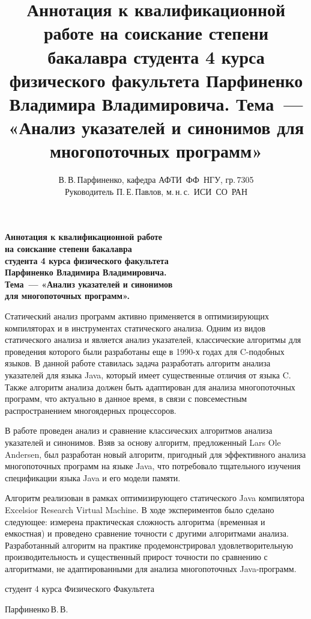 \documentclass[12pt]{article}
\title{
  Аннотация к квалификационной работе на соискание степени бакалавра студента 4
  курса физического факультета Парфиненко Владимира Владимировича.
  Тема~--- «Анализ указателей и синонимов для многопоточных программ»
}
\author{
  В.\,В.\,Парфиненко, кафедра АФТИ~ФФ~НГУ, гр.\,7305\\
  Руководитель П.\,Е.\,Павлов, м.\,н.\,с.~ИСИ~СО~РАН
}
\newcommand{\eng}[1]{{\English#1}}
\begin{document}
  \thispagestyle{empty}

  \begin{center}
    \bfseries
    Аннотация к квалификационной работе\\
    на соискание степени бакалавра\\
    студента 4 курса физического факультета\\
    Парфиненко Владимира Владимировича.\\
    Тема~--- «Анализ указателей и синонимов\\
    для многопоточных программ».
  \end{center}
  \vspace{0.5cm}

  Статический анализ программ активно применяется в оптимизирующих компиляторах
  и в инструментах статического анализа. Одним из видов статического анализа и
  является анализ указателей, классические алгоритмы для проведения которого
  были разработаны еще в 1990-х годах для \eng{C}-подобных языков. В данной
  работе ставилась задача разработать алгоритм анализа указателей для
  языка \eng{Java}, который имеет существенные отличия от языка \eng{C}.
  Также алгоритм анализа должен быть адаптирован для анализа многопоточных
  программ, что актуально в данное время, в связи с повсеместным
  распространением многоядерных процессоров.

  В работе проведен анализ и сравнение классических алгоритмов анализа
  указателей и синонимов. Взяв за основу алгоритм, предложенный \eng{Lars Ole
  Andersen}, был разработан новый алгоритм, пригодный для эффективного анализа
  многопоточных программ на языке \eng{Java}, что потребовало тщательного
  изучения спецификации языка \eng{Java} и его модели памяти.

  Алгоритм реализован в рамках оптимизирующего статического \eng{Java}
  компилятора \eng{Excelsior Research Virtual Machine}. В ходе экспериментов
  было сделано следующее: измерена практическая сложность алгоритма
  (временная и емкостная) и проведено сравнение точности с другими алгоритмами
  анализа. Разработанный алгоритм на практике продемонстрировал
  удовлетворительную производительность и существенный прирост точности по
  сравнению с алгоритмами, не адаптированными для анализа многопоточных
  \eng{Java}-программ.

  \vspace{0.5cm}

  \begin{flushright}

    студент 4 курса Физического Факультета

    Парфиненко\,В.\,В.

  \end{flushright}
\end{document}
